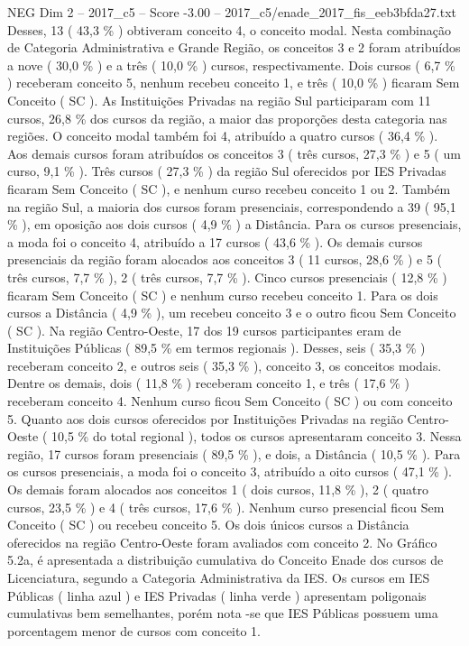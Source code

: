 \begin{textsample}{NEG Dim 2 – 2017\_c5 – Score -3.00 – 2017\_c5/enade\_2017\_fis\_eeb3bfda27.txt}
Desses, 13 ( 43,3 \% ) obtiveram conceito 4, o conceito modal.
Nesta combinação de Categoria Administrativa e Grande Região, os conceitos 3 e 2 foram atribuídos a nove ( 30,0 \% ) e a três ( 10,0 \% ) cursos, respectivamente.
Dois cursos ( 6,7 \% ) receberam conceito 5, nenhum recebeu conceito 1, e três ( 10,0 \% ) ficaram Sem Conceito ( SC ).
As Instituições Privadas na região Sul participaram com 11 cursos, 26,8 \% dos cursos da região, a maior das proporções desta categoria nas regiões.
O conceito modal também foi 4, atribuído a quatro cursos ( 36,4 \% ).
Aos demais cursos foram atribuídos os conceitos 3 ( três cursos, 27,3 \% ) e 5 ( um curso, 9,1 \% ).
Três cursos ( 27,3 \% ) da região Sul oferecidos por IES Privadas ficaram Sem Conceito ( SC ), e nenhum curso recebeu conceito 1 ou 2.
Também na região Sul, a maioria dos cursos foram presenciais, correspondendo a 39 ( 95,1 \% ), em oposição aos dois cursos ( 4,9 \% ) a Distância.
Para os cursos presenciais, a moda foi o conceito 4, atribuído a 17 cursos ( 43,6 \% ).
Os demais cursos presenciais da região foram alocados aos conceitos 3 ( 11 cursos, 28,6 \% ) e 5 ( três cursos, 7,7 \% ), 2 ( três cursos, 7,7 \% ).
Cinco cursos presenciais ( 12,8 \% ) ficaram Sem Conceito ( SC ) e nenhum curso recebeu conceito 1.
Para os dois cursos a Distância ( 4,9 \% ), um recebeu conceito 3 e o outro ficou Sem Conceito ( SC ).
Na região Centro-Oeste, 17 dos 19 cursos participantes eram de Instituições Públicas ( 89,5 \% em termos regionais ).
Desses, seis ( 35,3 \% ) receberam conceito 2, e outros seis ( 35,3 \% ), conceito 3, os conceitos modais.
Dentre os demais, dois ( 11,8 \% ) receberam conceito 1, e três ( 17,6 \% ) receberam conceito 4.
Nenhum curso ficou Sem Conceito ( SC ) ou com conceito 5.
Quanto aos dois cursos oferecidos por Instituições Privadas na região Centro-Oeste ( 10,5 \% do total regional ), todos os cursos apresentaram conceito 3.
Nessa região, 17 cursos foram presenciais ( 89,5 \% ), e dois, a Distância ( 10,5 \% ).
Para os cursos presenciais, a moda foi o conceito 3, atribuído a oito cursos ( 47,1 \% ).
Os demais foram alocados aos conceitos 1 ( dois cursos, 11,8 \% ), 2 ( quatro cursos, 23,5 \% ) e 4 ( três cursos, 17,6 \% ).
Nenhum curso presencial ficou Sem Conceito ( SC ) ou recebeu conceito 5.
Os dois únicos cursos a Distância oferecidos na região Centro-Oeste foram avaliados com conceito 2.
No Gráfico 5.2a, é apresentada a distribuição cumulativa do Conceito Enade dos cursos de Licenciatura, segundo a Categoria Administrativa da IES.
Os cursos em IES Públicas ( linha azul ) e IES Privadas ( linha verde ) apresentam poligonais cumulativas bem semelhantes, porém nota -se que IES Públicas possuem uma porcentagem menor de cursos com conceito 1.

\end{textsample}
